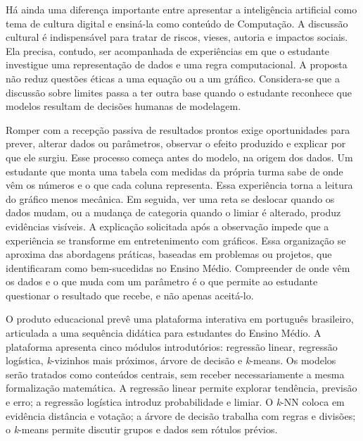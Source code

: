Há ainda uma diferença importante entre apresentar a inteligência artificial como tema de cultura digital e ensiná-la como conteúdo de Computação. A discussão cultural é indispensável para tratar de riscos, vieses, autoria e impactos sociais. Ela precisa, contudo, ser acompanhada de experiências em que o estudante investigue uma representação de dados e uma regra computacional. A proposta não reduz questões éticas a uma equação ou a um gráfico. Considera-se que a discussão sobre limites passa a ter outra base quando o estudante reconhece que modelos resultam de decisões humanas de modelagem.

Romper com a recepção passiva de resultados prontos exige oportunidades para prever, alterar dados ou parâmetros, observar o efeito produzido e explicar por que ele surgiu. Esse processo começa antes do modelo, na origem dos dados. Um estudante que monta uma tabela com medidas da própria turma sabe de onde vêm os números e o que cada coluna representa. Essa experiência torna a leitura do gráfico menos mecânica. Em seguida, ver uma reta se deslocar quando os dados mudam, ou a mudança de categoria quando o limiar é alterado, produz evidências visíveis. A explicação solicitada após a observação impede que a experiência se transforme em entretenimento com gráficos. Essa organização se aproxima das abordagens práticas, baseadas em problemas ou projetos, que  identificaram como bem-sucedidas no Ensino Médio. Compreender de onde vêm os dados e o que muda com um parâmetro é o que permite ao estudante questionar o resultado que recebe, e não apenas aceitá-lo.

O produto educacional prevê uma plataforma interativa em português brasileiro, articulada a uma sequência didática para estudantes do Ensino Médio. A plataforma apresenta cinco módulos introdutórios: regressão linear, regressão logística, \textit{k}-vizinhos mais próximos, árvore de decisão e \textit{k}-means. Os modelos serão tratados como conteúdos centrais, sem receber necessariamente a mesma formalização matemática. A regressão linear permite explorar tendência, previsão e erro; a regressão logística introduz probabilidade e limiar. O \textit{k}-NN coloca em evidência distância e votação; a árvore de decisão trabalha com regras e divisões; o \textit{k}-means permite discutir grupos e dados sem rótulos prévios.

